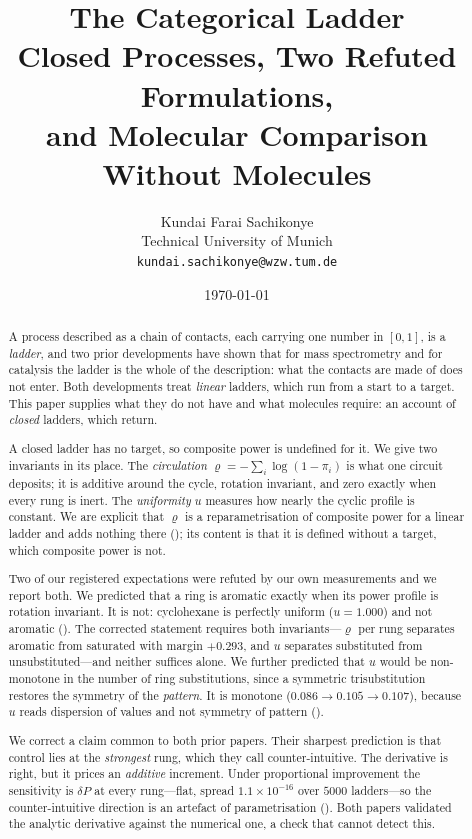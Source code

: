 \documentclass[11pt,a4paper]{article}
\title{\textbf{The Categorical Ladder}\\[6pt]
\large Closed Processes, Two Refuted Formulations,\\
and Molecular Comparison Without Molecules}
\author{%
Kundai Farai Sachikonye\\
\small Technical University of Munich\\
\small \texttt{kundai.sachikonye@wzw.tum.de}}
\date{\today}
\theoremstyle{clthm}
\theoremstyle{definition}
\theoremstyle{remark}
\newcommand{\pow}{\pi}
\newcommand{\circu}{\varrho}
\newcommand{\unif}{u}
\begin{document}
\maketitle

\begin{abstract}
\noindent
A process described as a chain of contacts, each carrying one number in
$[0,1]$, is a \emph{ladder}, and two prior developments have shown that
for mass spectrometry and for catalysis the ladder is the whole of the
description: what the contacts are made of does not enter. Both
developments treat \emph{linear} ladders, which run from a start to a
target. This paper supplies what they do not have and what molecules
require: an account of \emph{closed} ladders, which return.

A closed ladder has no target, so composite power is undefined for it. We
give two invariants in its place. The \emph{circulation}
$\circu=-\sum_i\log(1-\pow_i)$ is what one circuit deposits; it is
additive around the cycle, rotation invariant, and zero exactly when every
rung is inert. The \emph{uniformity} $\unif$ measures how nearly the
cyclic profile is constant. We are explicit that $\circu$ is a
reparametrisation of composite power for a linear ladder and adds nothing
there (); its content is that it is defined without a
target, which composite power is not.

Two of our registered expectations were refuted by our own measurements
and we report both. We predicted that a ring is aromatic exactly when its
power profile is rotation invariant. It is not: cyclohexane is perfectly
uniform ($\unif=1.000$) and not aromatic (). The corrected
statement requires both invariants---$\circu$ per rung separates aromatic
from saturated with margin $+0.293$, and $\unif$ separates substituted
from unsubstituted---and neither suffices alone. We further predicted that
$\unif$ would be non-monotone in the number of ring substitutions, since a
symmetric trisubstitution restores the symmetry of the \emph{pattern}. It
is monotone ($0.086\to0.105\to0.107$), because $\unif$ reads dispersion of
values and not symmetry of pattern ().

We correct a claim common to both prior papers. Their sharpest prediction
is that control lies at the \emph{strongest} rung, which they call
counter-intuitive. The derivative is right, but it prices an
\emph{additive} increment. Under proportional improvement the sensitivity
is $\delta P$ at every rung---flat, spread $1.1\times10^{-16}$ over $5000$
ladders---so the counter-intuitive direction is an artefact of
parametrisation (). Both papers validated the
analytic derivative against the numerical one, a check that cannot detect
this.


\end{abstract}
\end{document}
